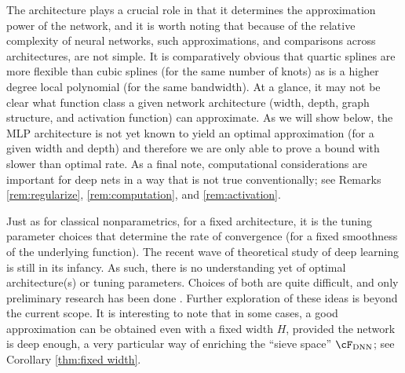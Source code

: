 \documentclass[11pt]{article}
\numberwithin{equation}{section}
\theoremstyle{definition}
\begin{document}
The architecture plays a crucial role in that it determines the approximation power of the network, and it is worth noting that because of the relative complexity of neural networks, such approximations, and comparisons across architectures, are not simple. It is comparatively obvious that quartic splines are more flexible than cubic splines (for the same number of knots) as is a higher degree local polynomial (for the same bandwidth). At a glance, it may not be clear what function class a given network architecture (width, depth, graph structure, and activation function) can approximate. As we will show below, the MLP architecture is not yet known to yield an optimal approximation (for a given width and depth) and therefore we are only able to prove a bound with slower than optimal rate. As a final note, computational considerations are important for deep nets in a way that is not true conventionally; see Remarks \ref{rem:regularize}, \ref{rem:computation}, and \ref{rem:activation}.



Just as for classical nonparametrics, for a fixed architecture, it is the tuning parameter choices that determine the rate of convergence (for a fixed smoothness of the underlying function). The recent wave of theoretical study of deep learning is still in its infancy. As such, there is no understanding yet of optimal architecture(s) or tuning parameters. Choices of both are quite difficult, and only preliminary research has been done \citep[see e.g.,][and references therein]{daniely2017depth, telgarsky2016benefits, safran2016depth, Mhaskar-Poggio2016_WP,Raghu-etal2017_ICML}. Further exploration of these ideas is beyond the current scope. It is interesting to note that in some cases, a good approximation can be obtained even with a fixed width $H$, provided the network is deep enough, a very particular way of enriching the ``sieve space'' $\cF_{\rm DNN}$; see Corollary \ref{thm:fixed width}.









 
 
 
 
\end{document}

